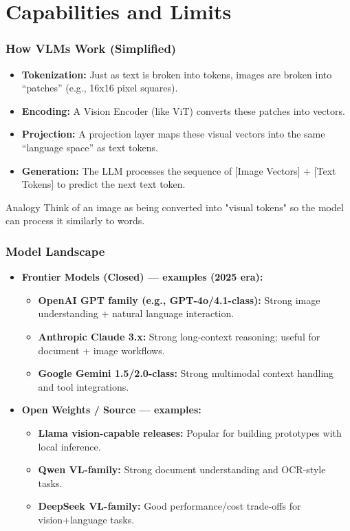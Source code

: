 \documentclass{beamer}
\begin{document}
\section{Capabilities and Limits}

\begin{frame}
    \frametitle{How VLMs Work (Simplified)}
    \begin{itemize}
        \item \textbf{Tokenization:} Just as text is broken into tokens, images are broken into ``patches'' (e.g., 16x16 pixel squares).
        \item \textbf{Encoding:} A Vision Encoder (like ViT) converts these patches into vectors.
        \item \textbf{Projection:} A projection layer maps these visual vectors into the same ``language space'' as text tokens.
        \item \textbf{Generation:} The LLM processes the sequence of [Image Vectors] + [Text Tokens] to predict the next text token.
    \end{itemize}
    \begin{block}{Analogy}
        Think of an image as being converted into "visual tokens" so the model can process it similarly to words.
    \end{block}
\end{frame}

\begin{frame}
    \frametitle{Model Landscape}
    \begin{itemize}
        \item \textbf{Frontier Models (Closed) --- examples (2025 era):}
        \begin{itemize}
            \item \textbf{OpenAI GPT family (e.g., GPT-4o/4.1-class):} Strong image understanding + natural language interaction.
            \item \textbf{Anthropic Claude 3.x:} Strong long-context reasoning; useful for document + image workflows.
            \item \textbf{Google Gemini 1.5/2.0-class:} Strong multimodal context handling and tool integrations.
        \end{itemize}
        \item \textbf{Open Weights / Source --- examples:}
        \begin{itemize}
            \item \textbf{Llama vision-capable releases:} Popular for building prototypes with local inference.
            \item \textbf{Qwen VL-family:} Strong document understanding and OCR-style tasks.
            \item \textbf{DeepSeek VL-family:} Good performance/cost trade-offs for vision+language tasks.
        \end{itemize}
    \end{itemize}
\end{frame}
\end{document}
